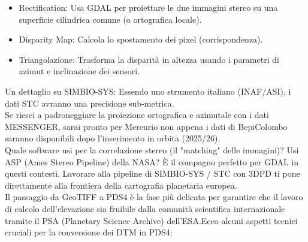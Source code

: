 \documentclass[a4paper,14pt]{article}
\begin{document}
\begin{itemize}
\item Rectification: Usa GDAL per proiettare le due immagini stereo su una superficie cilindrica comune (o ortografica locale).\\
\item Disparity Map: Calcola lo spostamento dei pixel (corrispondenza).\\
\item Triangolazione: Trasforma la disparità in altezza usando i parametri di azimut e inclinazione dei sensori.\\
\end{itemize}
Un dettaglio su SIMBIO-SYS: Essendo uno strumento italiano (INAF/ASI), i dati STC avranno una precisione sub-metrica.\\
Se riesci a padroneggiare la proiezione ortografica e azimutale con i dati MESSENGER, sarai pronto per Mercurio non appena i dati di BepiColombo saranno disponibili dopo l'inserimento in orbita (2025/26).\\
Quale software usi per la correlazione stereo (il "matching" delle immagini)? Usi ASP (Ames Stereo Pipeline) della NASA? È il compagno perfetto per GDAL in questi contesti.
Lavorare alla pipeline di SIMBIO-SYS / STC con 3DPD ti pone direttamente alla frontiera della cartografia planetaria europea.\\
Il passaggio da GeoTIFF a PDS4 è la fase più delicata per garantire che il lavoro di calcolo dell'elevazione sia fruibile dalla comunità scientifica internazionale tramite il PSA (Planetary Science Archive) dell'ESA.Ecco alcuni aspetti tecnici cruciali per la conversione dei DTM in PDS4:
\end{document}
